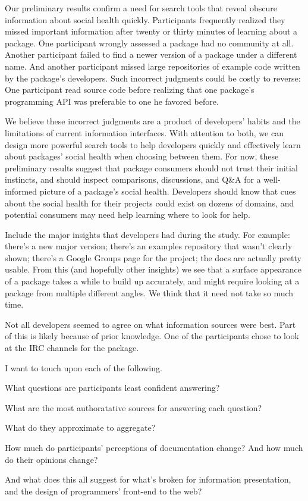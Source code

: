 Our preliminary results confirm a need for search tools that reveal obscure information about social health quickly.
Participants frequently realized they missed important information after twenty or thirty minutes of learning about a package.
One participant wrongly assessed a package had no community at all.
Another participant failed to find a newer version of a package under a different name.
And another participant missed large repositories of example code written by the package's developers.
Such incorrect judgments could be costly to reverse:
One participant read source code before realizing that one package's programming API was preferable to one he favored before.

We believe these incorrect judgments are a product of developers' habits and the limitations of current information interfaces.
With attention to both, we can design more powerful search tools to help developers quickly and effectively learn about packages' social health when choosing between them.
For now, these preliminary results suggest that
package consumers should not trust their initial instincts,
and should inspect comparisons, discussions, and Q\&A for a well-informed picture of a package's social health.
Developers should know that cues about the social health for their projects could exist on dozens of domains,
and potential consumers may need help learning where to look for help.

Include the major insights that developers had during the study.
For example:
there's a new major version;
there's an examples repository that wasn't clearly shown;
there's a Google Groups page for the project;
the docs are actually pretty usable.
From this (and hopefully other insights) we see that a surface appearance of a package takes a while to build up accurately, and might require looking at a package from multiple different angles.
We think that it need not take so much time.

Not all developers seemed to agree on what information sources were best.
Part of this is likely because of prior knowledge.
One of the participants chose to look at the IRC channels for the package.

I want to touch upon each of the following.

What questions are participants least confident answering?

What are the most authoratative sources for answering each question?

What do they approximate to aggregate?

How much do participants' perceptions of documentation change?  And how much do their opinions change?

And what does this all suggest for what's broken for information presentation, and the design of programmers' front-end to the web?
\fi

